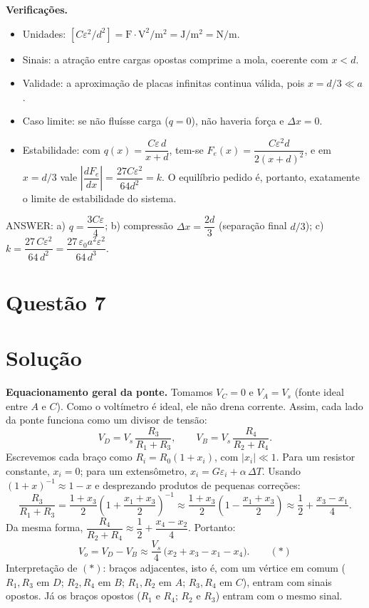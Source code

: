 \documentclass{article}%
\begin{document}
\textbf{Verificações.}
\begin{itemize}
\item Unidades: $[C\varepsilon^2/d^2] = \mathrm{F\cdot V^2/m^2} = \mathrm{J/m^2} = \mathrm{N/m}$.
\item Sinais: a atração entre cargas opostas comprime a mola, coerente com $x<d$.
\item Validade: a aproximação de placas infinitas continua válida, pois $x=d/3\ll a$.
\item Caso limite: se não fluísse carga ($q=0$), não haveria força e $\Delta x=0$.
\item Estabilidade: com $q(x)=\dfrac{C\varepsilon\,d}{x+d}$, tem-se $F_e(x)=\dfrac{C\varepsilon^2 d}{2(x+d)^2}$, e em $x=d/3$ vale $\left|\dfrac{dF_e}{dx}\right| = \dfrac{27C\varepsilon^2}{64d^2}=k$. O equilíbrio pedido é, portanto, exatamente o limite de estabilidade do sistema.
\end{itemize}

ANSWER: a) $q=\dfrac{3C\varepsilon}{4}$; b) compressão $\Delta x=\dfrac{2d}{3}$ (separação final $d/3$); c) $k=\dfrac{27\,C\varepsilon^2}{64\,d^2}=\dfrac{27\,\varepsilon_0 a^2\varepsilon^2}{64\,d^3}$.%
\newpage%
\section*{Questão 7}

\section*{Solução}

\textbf{Equacionamento geral da ponte.} Tomamos $V_C=0$ e $V_A=V_s$ (fonte ideal entre $A$ e $C$). Como o voltímetro é ideal, ele não drena corrente. Assim, cada lado da ponte funciona como um divisor de tensão:
\[
V_D=V_s\,\frac{R_3}{R_1+R_3},\qquad V_B=V_s\,\frac{R_4}{R_2+R_4}.
\]
Escrevemos cada braço como $R_i=R_0(1+x_i)$, com $|x_i|\ll 1$. Para um resistor constante, $x_i=0$; para um extensômetro, $x_i=G\varepsilon_i+\alpha\,\Delta T$. Usando $(1+x)^{-1}\approx 1-x$ e desprezando produtos de pequenas correções:
\[
\frac{R_3}{R_1+R_3}=\frac{1+x_3}{2}\left(1+\frac{x_1+x_3}{2}\right)^{-1}\approx\frac{1+x_3}{2}\left(1-\frac{x_1+x_3}{2}\right)\approx\frac12+\frac{x_3-x_1}{4}.
\]
Da mesma forma, $\dfrac{R_4}{R_2+R_4}\approx\dfrac12+\dfrac{x_4-x_2}{4}$. Portanto:
\[
V_o=V_D-V_B\approx\frac{V_s}{4}\,\bigl(x_2+x_3-x_1-x_4\bigr).\qquad(\ast)
\]
Interpretação de $(\ast)$: braços adjacentes, isto é, com um vértice em comum ($R_1,R_3$ em $D$; $R_2,R_4$ em $B$; $R_1,R_2$ em $A$; $R_3,R_4$ em $C$), entram com sinais opostos. Já os braços opostos ($R_1$ e $R_4$; $R_2$ e $R_3$) entram com o mesmo sinal.
\end{document}
